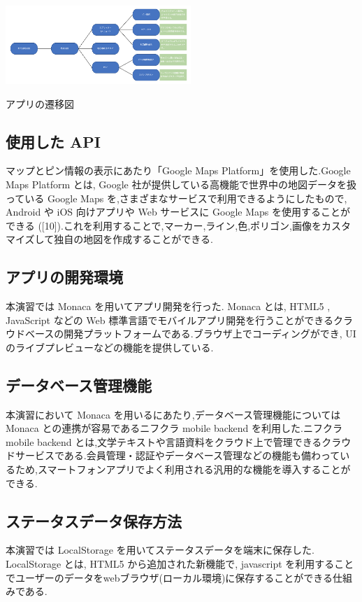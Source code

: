\documentclass[a4paper, twoside]{jarticle}
\makeatletter
\newenvironment{figurehere}
  {\def\@captype{figure}}
  {}
\makeatother
\begin{document}
\begin{multicols}{2}
\begin{figurehere}
\begin{center}
\includegraphics[bb=30 10 700 370,width=7cm]{./image13.png}
\end{center}
\caption{アプリの遷移図}\label{fig:12}
\end{figurehere}

\subsection{使用した API}
マップとピン情報の表示にあたり「Google Maps Platform」を使用した.Google Maps Platform とは, Google 社が提供している高機能で世界中の地図データを扱っている Google Maps を,さまざまなサービスで利用できるようにしたもので, Android や iOS 向けアプリや Web サービスに Google Maps を使用することができる ([10]).これを利用することで,マーカー,ライン,色,ポリゴン,画像をカスタマイズして独自の地図を作成することができる.

\subsection{アプリの開発環境}
本演習では Monaca を用いてアプリ開発を行った. Monaca とは, HTML5 , JavaScript などの Web 標準言語でモバイルアプリ開発を行うことができるクラウドベースの開発プラットフォームである.ブラウザ上でコーディングができ, UI のライブプレビューなどの機能を提供している.

\subsection{データベース管理機能}
本演習において Monaca を用いるにあたり,データベース管理機能については Monaca との連携が容易であるニフクラ mobile backend を利用した.ニフクラ mobile backend とは,文学テキストや言語資料をクラウド上で管理できるクラウドサービスである.会員管理・認証やデータベース管理などの機能も備わっているため,スマートフォンアプリでよく利用される汎用的な機能を導入することができる.

\subsection{ステータスデータ保存方法}
本演習では LocalStorage を用いてステータスデータを端末に保存した. LocalStorage とは, HTML5 から追加された新機能で, javascript を利用することでユーザーのデータをwebブラウザ(ローカル環境)に保存することができる仕組みである.


\end{multicols}
\end{document}
